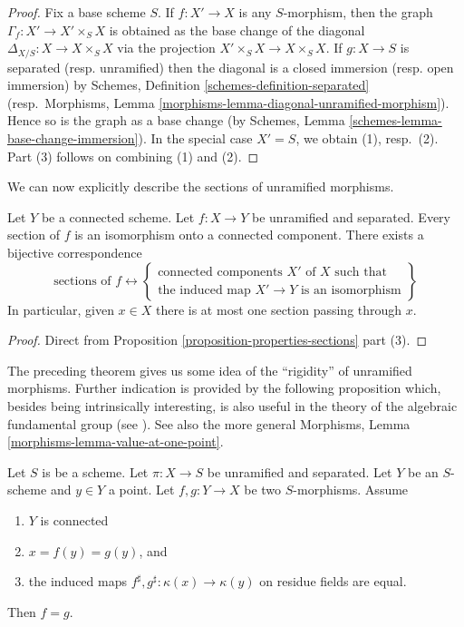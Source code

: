 \begin{proof}
Fix a base scheme $S$.
If $f : X' \to X$ is any $S$-morphism, then the graph
$\Gamma_f : X' \to X' \times_S X$
is obtained as the base change of the diagonal
$\Delta_{X/S} : X \to X \times_S X$ via the projection
$X' \times_S X \to X \times_S X$.
If $g : X \to S$ is separated (resp. unramified)
then the diagonal is a closed immersion (resp. open immersion)
by Schemes, Definition \ref{schemes-definition-separated}
(resp.\ Morphisms, Lemma \ref{morphisms-lemma-diagonal-unramified-morphism}).
Hence so is the graph as a base change (by
Schemes, Lemma \ref{schemes-lemma-base-change-immersion}).
In the special case $X' = S$, we obtain (1), resp.\ (2).
Part (3) follows on combining (1) and (2).
\end{proof}

\noindent
We can now explicitly describe the sections of unramified morphisms.

\begin{theorem}
\label{theorem-sections-unramified-maps}
Let $Y$ be a connected scheme.
Let $f : X \to Y$ be unramified and separated.
Every section of $f$ is an isomorphism onto a connected component.
There exists a bijective correspondence
$$
\text{sections of }f
\leftrightarrow
\left\{
\begin{matrix}
\text{connected components }X'\text{ of }X\text{ such that}\\
\text{the induced map }X' \to Y\text{ is an isomorphism}
\end{matrix}
\right\}
$$
In particular, given $x \in X$ there is at most one
section passing through $x$.
\end{theorem}

\begin{proof}
Direct from Proposition \ref{proposition-properties-sections} part (3).
\end{proof}

\noindent
The preceding theorem gives us some idea of the ``rigidity'' of unramified
morphisms. Further indication is provided by the following proposition
which, besides being intrinsically interesting, is also useful in the
theory of the algebraic fundamental group (see \cite[Expos\'e V]{SGA1}).
See also the more general
Morphisms, Lemma \ref{morphisms-lemma-value-at-one-point}.

\begin{proposition}
\label{proposition-equality}
Let $S$ is be a scheme.
Let $\pi : X \to S$ be unramified and separated.
Let $Y$ be an $S$-scheme and $y \in Y$ a point.
Let $f, g : Y \to X$ be two $S$-morphisms. Assume
\begin{enumerate}
\item $Y$ is connected
\item $x = f(y) = g(y)$, and
\item the induced maps $f^\sharp, g^\sharp : \kappa(x) \to \kappa(y)$
on residue fields are equal.
\end{enumerate}
Then $f = g$.
\end{proposition}


